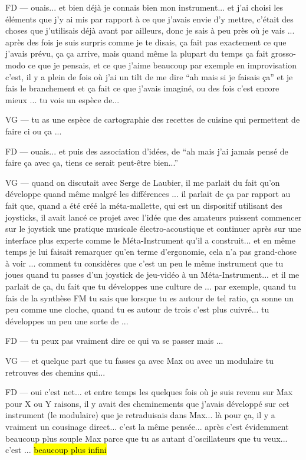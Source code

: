 FD — ouais... et bien déjà je connais bien mon instrument... et j'ai choisi les éléments que j'y ai mis par rapport à ce que j'avais envie d'y mettre, c'était des choses que j'utilisais déjà avant par ailleurs, donc je sais à peu près où je vais ... après des fois je suis surpris comme je te disais, ça fait pas exactement ce que j'avais prévu, ça ça arrive, mais quand même la plupart du temps ça fait grosso-modo ce que je pensais, et ce que j'aime beaucoup par exemple en improvisation c'est, il y a plein de fois où j'ai un tilt de me dire ``ah mais si je faisais ça'' et je fais le branchement et ça fait ce que j'avais imaginé, ou des fois c'est encore mieux ... tu vois un espèce de... 

VG — tu as une espèce de cartographie des recettes de cuisine qui permettent de faire ci ou ça ... 

FD — ouais... et puis des association d'idées, de ``ah mais j'ai jamais pensé de faire ça avec ça, tiens ce serait peut-être bien...''  

VG — quand on discutait avec Serge de Laubier, il me parlait du fait qu'on développe quand même malgré les différences ... il parlait de ça par rapport au fait que, quand a été créé la méta-mallette, qui est un dispositif utilisant des joysticks, il avait lancé ce projet avec l'idée que des amateurs puissent commencer sur le joystick une pratique musicale électro-acoustique et continuer après sur une interface plus experte comme le Méta-Instrument qu'il a construit... et en même temps je lui faisait remarquer qu'en terme d'ergonomie, cela n'a pas grand-chose à voir ... comment tu considères que c'est un peu le même instrument que tu joues quand tu passes d'un joystick de jeu-vidéo à un Méta-Instrument... et il me parlait de ça, du fait que tu développes une culture de ... par exemple, quand tu fais de la synthèse FM tu sais que lorsque tu es autour de tel ratio, ça sonne un peu comme une cloche, quand tu es autour de trois c'est plus cuivré... tu développes un peu une sorte de ... 

FD — tu peux pas vraiment dire ce qui va se passer mais ... 

VG — et quelque part que tu fasses ça avec Max ou avec un modulaire tu retrouves des chemins qui... 

FD — oui c'est net... et entre temps les quelques fois où je suis revenu sur Max pour X ou Y raisons, il y avait des cheminements que j'avais développé sur cet instrument (le modulaire) que je retraduisais dans Max... là pour ça, il y a vraiment un cousinage direct... c'est la même pensée... après c'est évidemment beaucoup plus souple Max parce que tu as autant d'oscillateurs que tu veux... c'est ... \hl{beaucoup plus infini} 

